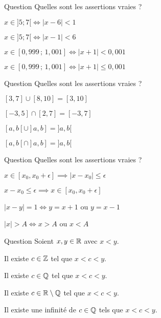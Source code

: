 \begin{multi}[multiple,feedback=
{\(|x-a| \le \epsilon \iff x \in [a-\epsilon,a+\epsilon]\)
}]{Question}
Quelles sont les assertions vraies ?

    \item* \(x \in ]5;7[ \iff |x-6|<1\)
    \item \(x \in ]5;7[ \iff |x-1|<6\)
    \item \(x \in [0,999 \, ; \, 1,001] \iff |x+1|<0,001\)
    \item \(x \in [0,999 \, ; \, 1,001] \iff |x+1|\le 0,001\)
\end{multi}


\begin{multi}[multiple,feedback=
{Tracer les intervalles sur la droite réelle pour mieux comprendre.
}]{Question}
Quelles sont les assertions vraies ?

    \item \([3,7] \cup [8,10] = [3,10]\)
    \item \([-3,5] \cap [2,7] = [-3,7]\)
    \item \([a,b[\cup ]a,b] = ]a,b[\)
    \item* \([a,b[\cap ]a,b] = ]a,b[\)
\end{multi}


\begin{multi}[multiple,feedback=
{\(|x-a| \le \epsilon \iff x \in [a-\epsilon,a+\epsilon]\)
}]{Question}
Quelles sont les assertions vraies ?

    \item* \(x \in [x_0,x_0+\epsilon] \implies |x-x_0| \le \epsilon\)
    \item \(x-x_0 \le \epsilon \implies x \in [x_0,x_0+\epsilon]\)
    \item* \(|x-y|=1 \iff y=x+1\) ou \(y=x-1\)
    \item \(|x| > A \iff x > A\) ou  \(x < A\)
\end{multi}


\begin{multi}[multiple,feedback=
{Entre deux nombres réels, il existe une infinité de rationnels et aussi une infinité de nombres irrationnels.
}]{Question}
Soient \(x,y \in \mathbb{R}\) avec \(x<y\).

    \item Il existe \(c\in\mathbb{Z}\) tel que \(x < c < y\).
    \item* Il existe \(c\in\mathbb{Q}\) tel que \(x < c < y\).
    \item* Il existe \(c\in\mathbb{R}\setminus\mathbb{Q}\) tel que \(x < c <y\).
    \item* Il existe une infinité de \(c\in\mathbb{Q}\) tels que \(x < c < y\).
\end{multi}


